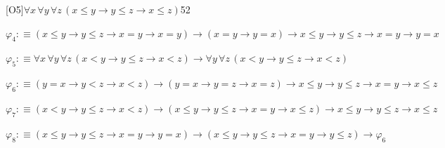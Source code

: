 \begin{fullproof}{[O5]}{$\forall x\,\forall y\,\forall z\,(x \leq y \to y \leq z \to x \leq z)$}{52}
\begin{abbrevlist}
\item $\varphi_{4} :\equiv (x \leq y \to y \leq z \to x = y \to x = y) \to (x = y \to y = x) \to x \leq y \to y \leq z \to x = y \to y = x$
\item $\varphi_{5} :\equiv \forall x\,\forall y\,\forall z\,(x < y \to y \leq z \to x < z) \to \forall y\,\forall z\,(x < y \to y \leq z \to x < z)$
\item $\varphi_{6} :\equiv (y = x \to y < z \to x < z) \to (y = x \to y = z \to x = z) \to x \leq y \to y \leq z \to x = y \to x \leq z$
\item $\varphi_{7} :\equiv (x < y \to y \leq z \to x < z) \to (x \leq y \to y \leq z \to x = y \to x \leq z) \to x \leq y \to y \leq z \to x \leq z$
\item $\varphi_{8} :\equiv (x \leq y \to y \leq z \to x = y \to y = x) \to (x \leq y \to y \leq z \to x = y \to y \leq z) \to \varphi_{6}$
\end{abbrevlist}
\end{fullproof}
